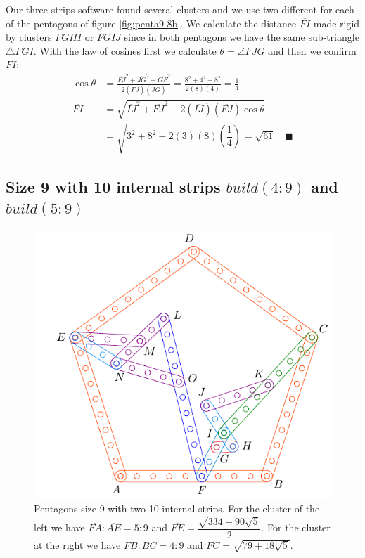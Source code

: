 \documentclass[11pt]{article}
\begin{document}
Our three-strips software found several clusters and we use two different for each of the pentagons of figure \ref{fig:penta9-8b}. We calculate the distance $\overline{FI}$ made rigid by clusters $FGHI$ or $FGIJ$ since in both pentagons we have the same sub-triangle $\triangle{FGI}$. With the law of cosines first we calculate $\theta = \angle{FJG}$ and then we confirm $\overline{FI}$:
\begin{align}
\cos\theta &= \frac{\overline{FJ}^2 + \overline{JG}^2 - \overline{GF}^2}
 {2(\overline{FJ})(\overline{JG})}
 = \frac{8^2 + 4^2 - 8^2}{2(8)(4)} = \frac{1}4 \nonumber\\
\overline{FI} &= \sqrt{\overline{IJ}^2 + \overline{FJ}^2 
 - 2(\overline{IJ})(\overline{FJ})\cos\theta} \nonumber\\
 &= \sqrt{3^2 + 8^2 - 2(3)(8)\left(\dfrac{1}4\right)} = \sqrt{61} \quad\blacksquare
\end{align}

\subsection{Size 9 with 10 internal strips $build(4:9)$ and $build(5:9)$}

\begin{figure}[h]
 \centering
 \includegraphics[scale=0.9]{9/penta9b}
 \caption{Pentagons size 9 with two 10 internal strips. For the cluster of the left we have $\overline{FA}:\overline{AE} = 5:9$ and $\overline{FE} = \dfrac{\sqrt{334 + 90\sqrt5}}2$. For the cluster at the right we have $\overline{FB}:\overline{BC} = 4:9$ and $\overline{FC}=\sqrt{79 + 18\sqrt5}$.}
 \label{fig:penta9b}
\end{figure}
\end{document}
